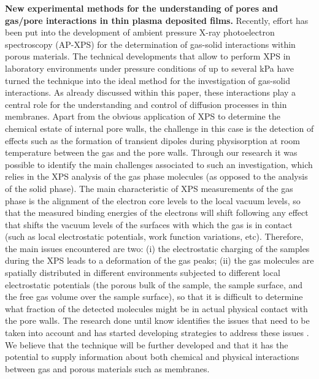 \documentclass[AMA,STIX2COL]{WileyNJD-v2} %
\begin{document}
\textbf{New experimental methods for the understanding of pores and gas/pore interactions in thin plasma deposited films.}  Recently, effort has been put into the development of ambient pressure X-ray photoelectron spectroscopy (AP-XPS) for the determination of gas-solid interactions within porous materials. The technical developments that allow to perform XPS in laboratory environments under pressure conditions of up to several kPa have turned the technique into the ideal method for the investigation of gas-solid interactions. As already discussed within this paper, these interactions play a central role for the understanding and control of diffusion processes in thin membranes. Apart from the obvious application of XPS to determine the chemical estate of internal pore walls, the challenge in this case is the detection of effects such as the formation of transient dipoles during physisorption at room temperature between the gas and the pore walls. Through our research it was possible to identify the main challenges associated to such an investigation, which relies in the XPS analysis of the gas phase molecules (as opposed to the analysis of the solid phase). The main characteristic of XPS measurements of the gas phase is the alignment of the electron core levels to the local vacuum levels, so that the measured binding energies of the electrons will shift following any effect that shifts the vacuum levels of the surfaces with which the gas is in contact (such as local electrostatic potentials, work function variations, etc). Therefore, the main issues encountered are two: (i) the electrostatic charging of the samples during the XPS leads to a deformation of the gas peaks; (ii) the gas molecules are spatially distributed in different environments subjected to different local electrostatic potentials (the porous bulk of the sample, the sample surface, and the free gas volume over the sample surface), so that it is difficult to determine what fraction of the detected molecules might be in actual physical contact with the pore walls. The research done until know identifies the issues that need to be taken into account \cite{delosArcos.2022} and has started developing strategies to address these issues \cite{delosArcos.2023}. We believe that the technique will be further developed and that it has the potential to supply information about both chemical and physical interactions between gas and porous materials such as membranes.
\end{document}
